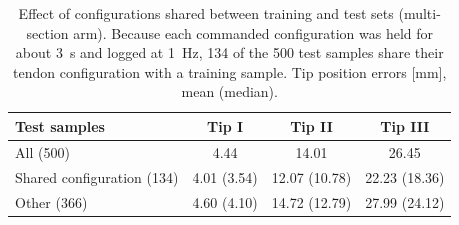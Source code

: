 \begin{table}[h]
\centering
\caption{Effect of configurations shared between training and test sets (multi-section arm). Because each commanded configuration was held for about 3~s and logged at 1~Hz, 134 of the 500 test samples share their tendon configuration with a training sample. Tip position errors [mm], mean (median).}
\label{tab:S14_overlap}
\begin{tabular}{lccc}
\toprule
Test samples & Tip I & Tip II & Tip III \\
\midrule
All (500) & 4.44 & 14.01 & 26.45 \\
Shared configuration (134) & 4.01 (3.54) & 12.07 (10.78) & 22.23 (18.36) \\
Other (366) & 4.60 (4.10) & 14.72 (12.79) & 27.99 (24.12) \\
\bottomrule
\end{tabular}
\end{table}
